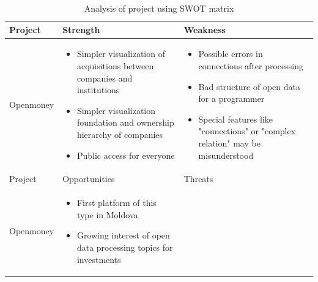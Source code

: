 \documentclass[12pt,a4paper,titlepage]{article}
\begin{document}
\begin{table}[h]
\begin{threeparttable}
    \centering
    \caption{Analysis of project using SWOT matrix}
    \label{table:4.swot-analysis}
    \begin{tabular}{ | l | l | l | }
        \hline
        Project &   Strength    &   Weakness  \\
        \hline
            Openmoney    &
            \begin{minipage}{3in}
                \vspace{.5cm}
                \begin{itemize}
                    \item Simpler visualization of acquisitions between companies and institutions
                    \item Simpler visualization foundation and ownership hierarchy of companies
                    \item Public access for everyone
                \end{itemize}
            \vspace{.5cm}
            \end{minipage} & 
            \begin{minipage}{3in}
                \vspace{.5cm}
                \begin{itemize}
                    \item Possible errors in connections after processing
                    \item Bad structure of open data for a programmer
                    \item Special features like "connections" or "complex relation" may be misunderstood
                \end{itemize}
                \vspace{.5cm}
            \end{minipage}\\
        \hline
            Project &   Opportunities    &   Threats    \\
        \hline
            Openmoney    &
            \begin{minipage}{3in}
                \vspace{.5cm}
                \begin{itemize}
                    \item First platform of this type in Moldova
                    \item Growing interest of open data processing topics for investments

\end{itemize}
\end{minipage}
\end{tabular}
\end{threeparttable}
\end{table}
\end{document}
